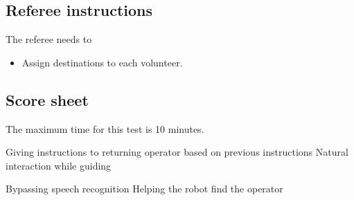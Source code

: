 \subsection*{Referee instructions}
The referee needs to
\begin{itemize}
	\item Assign destinations to each volunteer.
\end{itemize}

\subsection*{Score sheet}

The maximum time for this test is 10 minutes.

\begin{scorelist}

	 {Giving instructions to returning operator based on previous instructions}
	 {Natural interaction while guiding}
	
	 {Bypassing speech recognition}
	 {Helping the robot find the operator}
	

\end{scorelist}

